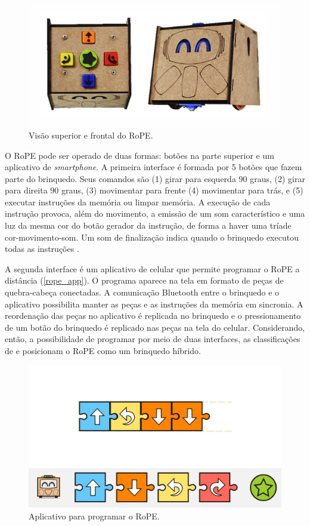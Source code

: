 \begin{figure}[!htpb]
  \centering
  \includegraphics[width=.9\linewidth,fbox]{figs/rope_up_front.png}
  \caption{Visão superior e frontal do RoPE.}
  \label{rope}
\end{figure}
O RoPE pode ser operado de duas formas: botões na parte superior e um aplicativo de \textit{smartphone}. A primeira interface é formada por 5 botões que fazem parte do brinquedo. Seus comandos são (1) girar para esquerda 90 graus, (2) girar para direita 90 graus, (3) movimentar para frente (4) movimentar para trás, e (5) executar instruções da memória ou limpar memória. A execução de cada instrução provoca, além do movimento, a emissão de um som característico e uma luz da mesma cor do botão gerador da instrução, de forma a haver uma tríade cor-movimento-som. Um som de finalização indica quando o brinquedo executou todas as instruções \cite{raabe_2017_rope}.

A segunda interface é um aplicativo de celular que permite programar o RoPE a distância (\autoref{rope_app}). O programa aparece na tela em formato de peças de quebra-cabeça conectadas. A comunicação Bluetooth entre o brinquedo e o aplicativo possibilita manter as peças e as instruções da memória em sincronia. A reordenação das peças no aplicativo é replicada no brinquedo e o pressionamento de um botão do brinquedo é replicado nas peças na tela do celular. Considerando, então, a possibilidade de programar por meio de duas interfaces, as classificações de  e  posicionam o RoPE como um brinquedo híbrido.

\begin{figure}[!htpb]
  \centering
  \includegraphics[width=.9\linewidth,fbox]{figs/app.jpg}
  \caption{Aplicativo para programar o RoPE.}
  \sourceauthor
  \label{rope_app}
\end{figure}

